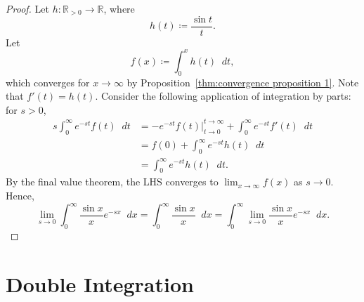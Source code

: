\documentclass[a4paper]{article}
\newcommand*\diff{\mathop{}\!d} %
\theoremstyle{definition}
\begin{document}
\begin{proof}
    Let $h: \mathbb{R}_{>0} \to \mathbb{R}$, where
    \begin{equation*}
        h(t) \coloneq \frac{\sin t}{t}.
    \end{equation*}
    Let
    \begin{equation*}
        f(x) \coloneq \int_{0}^{x} h(t) \diff t,
    \end{equation*}
    which converges for $x \to \infty$ by Proposition~\ref{thm:convergence proposition 1}.
    Note that $f'(t) = h(t)$.
    Consider the following application of integration by parts: for $s>0$,
    \begin{align*}
        s \int_{0}^{\infty} e^{-st} f(t) \diff t & = -e^{-st} f(t) \bigg|_{t\to 0}^{t\to \infty} + \int_{0}^{\infty} e^{-st} f'(t) \diff t \\
                                                 & = f(0) + \int_{0}^{\infty} e^{-st} h(t) \diff t                                         \\
                                                 & = \int_{0}^{\infty} e^{-st} h(t) \diff t.
    \end{align*}
    By the final value theorem, the LHS converges to $\lim_{x \to \infty} f(x)$ as $s \to 0$.
    Hence,
    \begin{equation*}
        \lim_{s\to 0} \int_{0}^{\infty} \frac{\sin x}{x} e^{-sx} \diff x = \int_{0}^{\infty} \frac{\sin x}{x} \diff x = \int_{0}^{\infty} \lim_{s \to 0} \frac{\sin x}{x} e^{-sx} \diff x.
    \end{equation*}
\end{proof}

\section{Double Integration}
\end{document}
